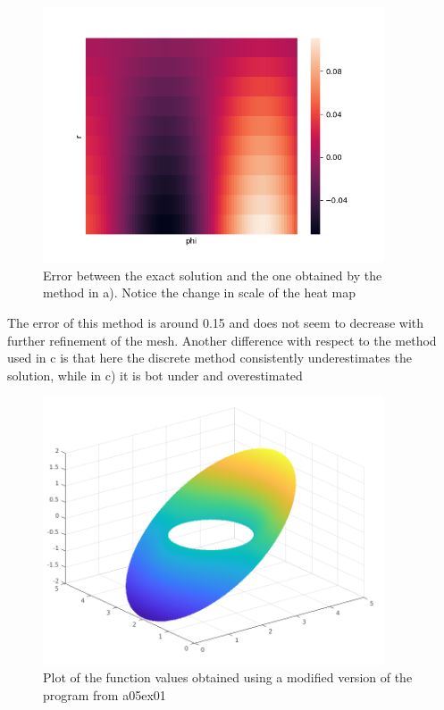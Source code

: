 \begin{figure}[H]
	\centering
	\includegraphics[width=0.9\textwidth]{Documentation/Figures/a06ex02c_error.png} 
	\caption{Error between the exact solution and the one obtained by the method in a). Notice the change in scale of the heat map}
	\label{fig:a05ex02b}
\end{figure}


The error of this method is around 0.15 and does not seem to decrease with further refinement of the mesh. Another difference with respect to the method used in c is that here the discrete method consistently underestimates the solution, while in c) it is bot under and overestimated 

\begin{figure}[H]
	\centering
	\includegraphics[width=0.9\textwidth]{Documentation/Figures/a06ex02d_uh.png} 
	\caption{Plot of the function values obtained using a modified version of the program from a05ex01}
	\label{fig:a05ex02b}
\end{figure}


